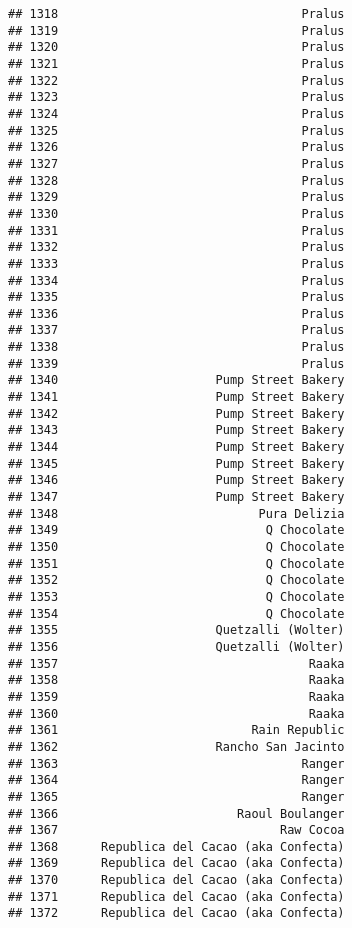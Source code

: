 \documentclass[
]{article}
\begin{document}
\begin{verbatim}
## 1318                                  Pralus
## 1319                                  Pralus
## 1320                                  Pralus
## 1321                                  Pralus
## 1322                                  Pralus
## 1323                                  Pralus
## 1324                                  Pralus
## 1325                                  Pralus
## 1326                                  Pralus
## 1327                                  Pralus
## 1328                                  Pralus
## 1329                                  Pralus
## 1330                                  Pralus
## 1331                                  Pralus
## 1332                                  Pralus
## 1333                                  Pralus
## 1334                                  Pralus
## 1335                                  Pralus
## 1336                                  Pralus
## 1337                                  Pralus
## 1338                                  Pralus
## 1339                                  Pralus
## 1340                      Pump Street Bakery
## 1341                      Pump Street Bakery
## 1342                      Pump Street Bakery
## 1343                      Pump Street Bakery
## 1344                      Pump Street Bakery
## 1345                      Pump Street Bakery
## 1346                      Pump Street Bakery
## 1347                      Pump Street Bakery
## 1348                            Pura Delizia
## 1349                             Q Chocolate
## 1350                             Q Chocolate
## 1351                             Q Chocolate
## 1352                             Q Chocolate
## 1353                             Q Chocolate
## 1354                             Q Chocolate
## 1355                      Quetzalli (Wolter)
## 1356                      Quetzalli (Wolter)
## 1357                                   Raaka
## 1358                                   Raaka
## 1359                                   Raaka
## 1360                                   Raaka
## 1361                           Rain Republic
## 1362                      Rancho San Jacinto
## 1363                                  Ranger
## 1364                                  Ranger
## 1365                                  Ranger
## 1366                         Raoul Boulanger
## 1367                               Raw Cocoa
## 1368      Republica del Cacao (aka Confecta)
## 1369      Republica del Cacao (aka Confecta)
## 1370      Republica del Cacao (aka Confecta)
## 1371      Republica del Cacao (aka Confecta)
## 1372      Republica del Cacao (aka Confecta)

\end{verbatim}
\end{document}
